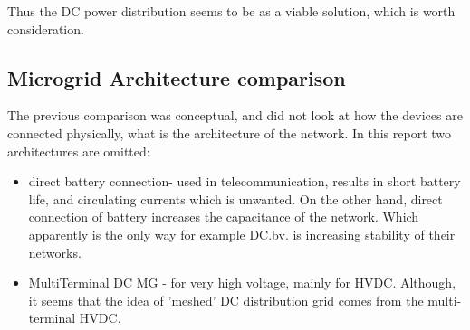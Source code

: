 \documentclass[]{scrartcl}
\begin{document}
Thus the DC power distribution seems to be as a viable solution, which is worth consideration.


\subsection{Microgrid Architecture comparison}
The previous comparison was conceptual, and did not look at how the devices are connected physically, what is the architecture of the network. In this report two architectures are omitted:
\begin{itemize}
	\item direct battery connection- used in telecommunication, results in short battery life, and circulating currents which is unwanted. On the other hand, direct connection of battery increases the capacitance of the network. Which apparently is the only way for example DC.bv. is increasing stability of their networks.
	\item MultiTerminal DC MG - for very high voltage, mainly for HVDC. Although, it seems that the idea of 'meshed' DC distribution grid \cite{Mackay2015a} comes from the multi-terminal HVDC.
\end{itemize}
\end{document}

